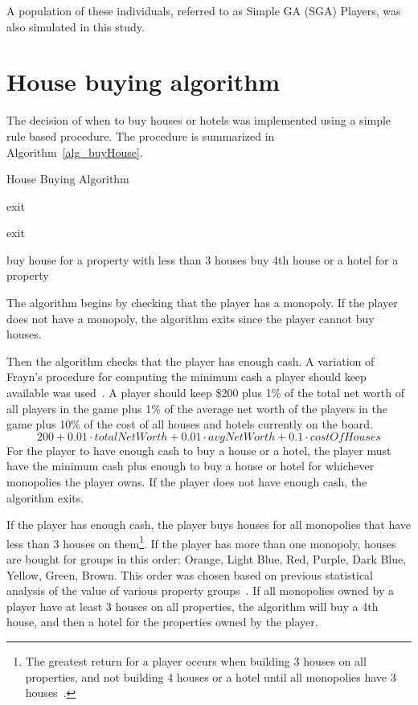 A population of these individuals, referred to as Simple GA (SGA) Players, was
also simulated in this study.

\section{House buying algorithm} \label{5_buy_house}

The decision of when to buy houses or hotels was implemented using a simple rule
based procedure. The procedure is summarized in Algorithm~\ref{alg_buyHouse}.

\begin{algorithm}
\caption{House Buying Algorithm}
\label{alg_buyHouse}
\begin{algorithmic}
  \STATE exit
\ENDIF

  \STATE exit
\ENDIF

    \STATE buy house for a property with less than 3 houses
  \ELSE
    \STATE buy 4th house or a hotel for a property
  \ENDIF
\ENDWHILE
\end{algorithmic}
\end{algorithm}

The algorithm begins by checking that the player has a monopoly. If the player
does not have a monopoly, the algorithm exits since the player cannot buy
houses.

Then the algorithm checks that the player has enough cash. A variation 
of Frayn's procedure for computing the minimum cash a player should keep
available was used~\cite{DBLP:conf/cig/Frayn05}. A player should keep
\$200 plus 1\% of the total net worth of all players in the game
plus 1\% of the average net worth of the players in the game plus 10\% of the
cost of all houses and hotels currently on the board.
\begin{equation*}
200 + 0.01 \cdot totalNetWorth + 0.01 \cdot avgNetWorth + 0.1 \cdot costOfHouses
\end{equation*}
For the player to have enough cash to buy a house or a hotel, the player must
have the minimum cash plus enough to buy a house or hotel for whichever
monopolies the player owns. If the player does not have enough cash, the
algorithm exits.

If the player has enough cash, the player buys houses for all monopolies
that have less than 3 houses on them\footnote{The greatest return for a player
occurs when building 3 houses on all properties, and not building 4 houses or a
hotel until all monopolies have 3 houses~\cite{orbanes2007monopoly}.}. If the
player has more than one monopoly, houses are bought for groups in this order:
Orange, Light Blue, Red, Purple, Dark Blue, Yellow, Green, Brown. This order was
chosen based on previous statistical analysis of the value of various property
groups~\cite{Ash1972,Abbott1997,DBLP:conf/cig/Frayn05}. If all monopolies owned
by a player have at least 3 houses on all properties, the algorithm will buy a
4th house, and then a hotel for the properties owned by the player.

